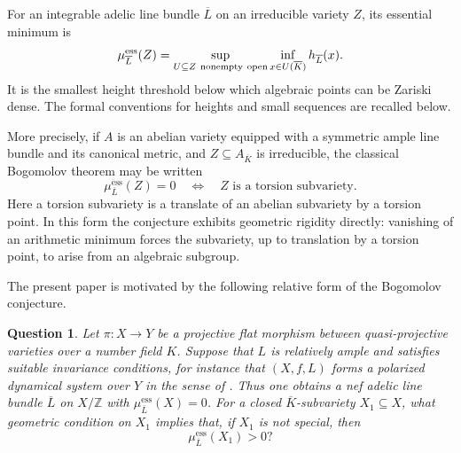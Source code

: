 \documentclass[10pt,a4paper]{amsart}
\theoremstyle{plain}
\theoremstyle{plain}
\newtheorem{ques}[thm]{Question} \newtheorem{prop}[thm]{Proposition}
\numberwithin{equation}{section}
\begin{document}
For an integrable adelic line bundle \(\overline L\) on an irreducible
variety \(Z\), its essential minimum is
\[
\mu^{\mathrm{ess}}_{\overline L}(Z)
=\sup_{U\subseteq Z\ {\rm nonempty\ open}}
\inf_{x\in U(\overline K)}h_{\overline L}(x).
\]
It is the smallest height threshold below which algebraic points can be
Zariski dense.  The formal conventions for heights and small sequences are
recalled below.

More precisely, if \(A\) is an abelian variety equipped with a symmetric
ample line bundle and its canonical metric, and \(Z\subseteq A_{\overline K}\)
is irreducible, the classical Bogomolov theorem may be written
\[
\mu^{\mathrm{ess}}_{\overline L}(Z)=0
\quad\Longleftrightarrow\quad
Z\text{ is a torsion subvariety}.
\]
Here a torsion subvariety is a translate of an abelian subvariety by a torsion
point.  In this form the conjecture exhibits geometric rigidity directly:
vanishing of an arithmetic minimum forces the subvariety, up to translation
by a torsion point, to arise from an algebraic subgroup.

The present paper is motivated by the following relative form of the
Bogomolov conjecture.
\begin{ques}
	Let \(\pi:X\to Y\) be a projective flat morphism between quasi-projective
	varieties over a number field \(K\).  Suppose that \(L\) is relatively ample
	and satisfies suitable invariance conditions, for instance that \((X,f,L)\)
	forms a polarized dynamical system over \(Y\) in the sense of \cite{YZ}.  Thus
	one obtains a nef adelic line bundle \(\overline L\) on \(X/\mathbb Z\) with
	\(\mu^{\mathrm{ess}}_{\overline L}(X)=0\).  For a closed
	\(\overline K\)-subvariety \(X_1\subseteq X\), what geometric condition on
	\(X_1\) implies that, if \(X_1\) is not special, then
	\[
	\mu^{\mathrm{ess}}_{\overline L}(X_1)>0?
	\]
\end{ques}
\end{document}
